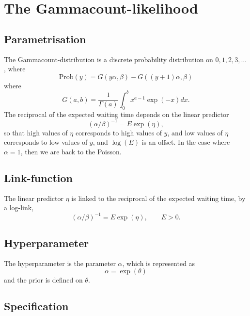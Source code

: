 \documentclass[a4paper,11pt]{article}
\begin{document}
\section*{The Gammacount-likelihood}

\subsection*{Parametrisation}

The Gammacount-distribution is a discrete probability distribution on
$0, 1, 2, 3, \ldots$,  where
\begin{displaymath}
    \text{Prob}(y) = G(y\alpha, \beta) - G((y+1)\alpha, \beta)
\end{displaymath}
where
\begin{displaymath}
    G(a, b) = \frac{1}{\Gamma(a)} \int_0^{b} x^{a-1}\exp(-x) dx.
\end{displaymath}
The reciprocal of the expected waiting time depends on the linear
predictor
\begin{displaymath}
    (\alpha/\beta)^{-1} = E\exp(\eta),
\end{displaymath}
so that high values of $\eta$ corresponds to high values of $y$, and
low values of $\eta$ corresponds to low values of $y$, and $\log(E)$
is an offset. In the case where $\alpha=1$, then we are back to the
Poisson.

\subsection*{Link-function}

The linear predictor $\eta$ is linked to the reciprocal of the
expected waiting time, by a log-link,
\begin{displaymath}
    (\alpha/\beta)^{-1} = E\exp(\eta), \qquad E >0.
\end{displaymath}

\subsection*{Hyperparameter}

The hyperparameter is the parameter $\alpha$, which is
represented as
\begin{displaymath}
    \alpha = \exp(\theta)
\end{displaymath}
and the prior is defined on $\theta$.

\subsection*{Specification}
\end{document}
